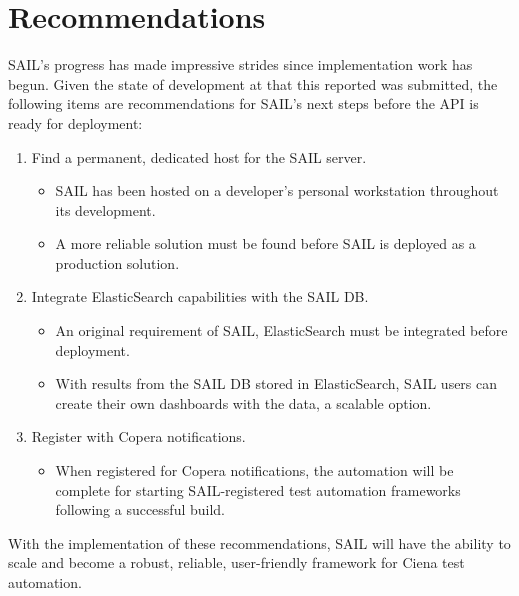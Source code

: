 \documentclass[10pt, titlepage, onecolumn, openany]{article}
\newcommand\backmatter{
    \cleardoublepage
    \pagenumbering{Roman}
}
\begin{document}
\section{Recommendations}
SAIL's progress has made impressive strides since implementation work has begun.
Given the state of development at that this reported was submitted,
the following items are recommendations for SAIL's next steps before the API is
ready for deployment:
\begin{enumerate}
    \item Find a permanent, dedicated host for the SAIL server.
    \begin{itemize}
        \item SAIL has been hosted on a developer's personal workstation
        throughout its development.
        \item A more reliable solution must be found before SAIL is deployed
        as a production solution.
    \end{itemize}
    \item Integrate ElasticSearch capabilities with the SAIL DB.
    \begin{itemize}
        \item An original requirement of SAIL, ElasticSearch must be integrated
        before deployment.
        \item With results from the SAIL DB stored in ElasticSearch, SAIL users
        can create their own dashboards with the data, a scalable option.
    \end{itemize}
    \item Register with Copera notifications.
    \begin{itemize}
        \item When registered for Copera notifications, the automation will be
        complete for starting SAIL-registered test automation frameworks
        following a successful build.
    \end{itemize}
\end{enumerate}
With the implementation of these recommendations, SAIL will have the ability to
scale and become a robust, reliable, user-friendly framework for Ciena test
automation.
\clearpage
\backmatter
\end{document}
